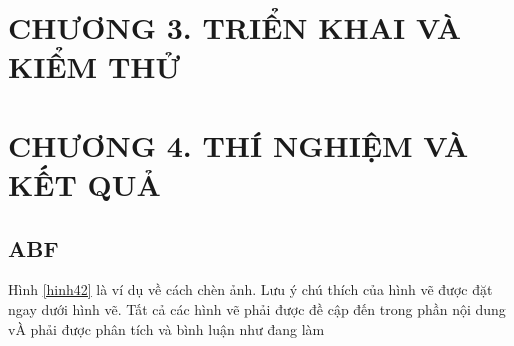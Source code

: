\documentclass{article}%
\begin{document}
\newpage
\section*{CHƯƠNG 3. TRIỂN KHAI VÀ KIỂM THỬ}
\setcounter{section}{3}
\setcounter{subsection}{0} %
\setcounter{table}{0} %
\setcounter{figure}{0} %

\section*{CHƯƠNG 4. THÍ NGHIỆM VÀ KẾT QUẢ}
\setcounter{section}{4}
\setcounter{equation}{0}

\setcounter{subsection}{0} %
\setcounter{table}{0} %
\setcounter{figure}{0} %
\subsection{ABF}
\lipsum

Hình \ref{hinh42} là ví dụ về cách chèn ảnh. Lưu ý chú thích của hình vẽ được đặt ngay dưới hình vẽ. Tất cả các hình vẽ 
phải được đề cập đến trong phần nội  dung vÀ phải được phân tích và bình luận như đang làm
\end{document}
